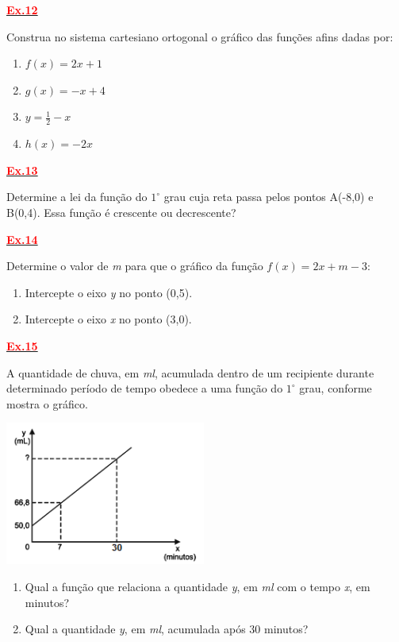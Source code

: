 \documentclass[12pt]{report}
\newcommand{\ex}[1]{\hypertarget{ex#1}{\noindent\hyperlink{gab#1}{\textcolor{red}{\textbf{Ex.#1}}}}}
\newenvironment{Figure}
  {\par\medskip\noindent\minipage{\linewidth}}
  {\endminipage\par\medskip}
\begin{document}
\begin{multicols}{2}
\ex{12} Construa no sistema cartesiano ortogonal o gráfico das funções afins dadas por:
\begin{enumerate}[label=\alph*)]
\item $f(x) = 2x + 1$
\item $g(x) = -x + 4$
\item $y = \frac{1}{2} - x$
\item $h(x) = -2x$
\end{enumerate}

\ex{13}  Determine a lei da função do $1^\circ$ grau cuja reta passa pelos pontos A(-8,0) e B(0,4). Essa função é crescente ou decrescente?

\ex{14}  Determine o valor de \textit{m} para que o gráfico da função $f(x) = 2x + m - 3$:
\begin{enumerate}[label=\alph*)]
	\item Intercepte o eixo \textit{y} no ponto (0,5).
	\item Intercepte o eixo \textit{x} no ponto (3,0).
\end{enumerate}

\ex{15} A quantidade de chuva, em \textit{ml}, acumulada dentro de um recipiente durante determinado período de tempo obedece a uma função do $1^\circ$ grau, conforme mostra o gráfico.
\begin{Figure}
 \centering
 \includegraphics[scale=0.8]{figures/q10.png}
\end{Figure}
\begin{enumerate}[label=\alph*)]
	\item Qual a função que relaciona a quantidade \textit{y}, em \textit{ml} com o tempo \textit{x}, em minutos? 
	\item Qual a quantidade \textit{y}, em \textit{ml}, acumulada após $30$ minutos?
\end{enumerate}


\end{multicols}
\end{document}
